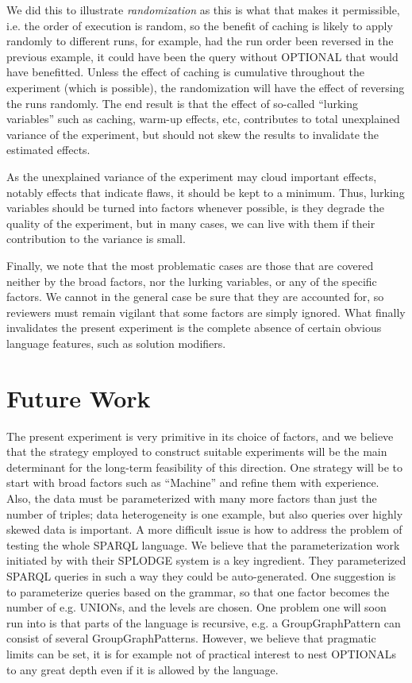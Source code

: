 \documentclass{llncs}
\begin{document}
We did this to illustrate \emph{randomization} as this is what that
makes it permissible, i.e. the order of execution is random, so the
benefit of caching is likely to apply randomly to different runs, for
example, had the run order been reversed in the previous example, it
could have been the query without OPTIONAL that would have
benefitted. Unless the effect of caching is cumulative throughout the
experiment (which is possible), the randomization will have the effect
of reversing the runs randomly. The end result is that the effect of
so-called ``lurking variables'' such as caching, warm-up effects, etc,
contributes to total unexplained variance of the experiment, but
should not skew the results to invalidate the estimated effects.

As the unexplained variance of the experiment may cloud important
effects, notably effects that indicate flaws, it should be kept to a
minimum. Thus, lurking variables should be turned into factors
whenever possible, is they degrade the quality of the experiment, but
in many cases, we can live with them if their contribution to the
variance is small.

Finally, we note that the most problematic cases are those that are
covered neither by the broad factors, nor the lurking variables, or
any of the specific factors. We cannot in the general case be sure
that they are accounted for, so reviewers must remain vigilant that
some factors are simply ignored. What finally invalidates the present
experiment is the complete absence of certain obvious language
features, such as solution modifiers.

\section{Future Work}

The present experiment is very primitive in its choice of factors, and
we believe that the strategy employed to construct suitable
experiments will be the main determinant for the long-term feasibility
of this direction. One strategy will be to start with broad factors
such as ``Machine'' and refine them with experience. Also, the data
must be parameterized with many more factors than just the number of
triples; data heterogeneity \cite{Duan:2011:AOC:1989323.1989340} is one
example, but also queries over highly skewed data is important. A more
difficult issue is how to address the problem of testing the whole
SPARQL language\cite{sparql11query}. We believe that the
parameterization work initiated by \cite{goerlitz2012splodge} with
their SPLODGE system is a key ingredient. They parameterized SPARQL
queries in such a way they could be auto-generated. One suggestion is
to parameterize queries based on the grammar, so that one factor
becomes the number of e.g. UNIONs, and the levels are chosen. One
problem one will soon run into is that parts of the language is
recursive, e.g. a GroupGraphPattern can consist of several
GroupGraphPatterns. However, we believe that pragmatic limits can be
set, it is for example not of practical interest to nest OPTIONALs to
any great depth even if it is allowed by the language.
\end{document}
